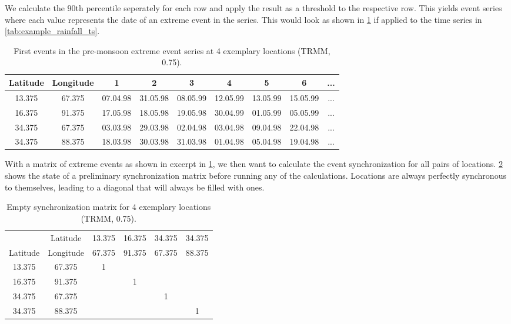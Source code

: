 We calculate the 90th percentile seperately for each row and apply the result as a threshold to the respective row. This yields event series where each value represents the date of an extreme event in the series. This would look as shown in \cref{tab:example_rainfall_events} if applied to the time series in \cref{tab:example_rainfall_ts}.

\begin{table}[h]
  \centering
  \begin{tabular}{ |c|c|ccccccc| }
    \hline
    Latitude & Longitude & 1 & 2 & 3 & 4 & 5 & 6 & ... \\
    \hline
    13.375 & 67.375 & 07.04.98 & 31.05.98 & 08.05.99 & 12.05.99 & 13.05.99 & 15.05.99 & ... \\
    16.375 & 91.375 & 17.05.98 & 18.05.98 & 19.05.98 & 30.04.99 & 01.05.99 & 05.05.99 & ... \\
    34.375 & 67.375 & 03.03.98 & 29.03.98 & 02.04.98 & 03.04.98 & 09.04.98 & 22.04.98 & ... \\
    34.375 & 88.375 & 18.03.98 & 30.03.98 & 31.03.98 & 01.04.98 & 05.04.98 & 19.04.98 & ... \\
    \hline
  \end{tabular}
  \caption{First events in the pre-monsoon extreme event series at 4 exemplary locations (TRMM, 0.75\degree).}
  \label{tab:example_rainfall_events}
\end{table}

With a matrix of extreme events as shown in excerpt in \cref{tab:example_rainfall_events}, we then want to calculate the event synchronization for all pairs of locations. \cref{tab:example_empty_sync} shows the state of a preliminary synchronization matrix before running any of the calculations. Locations are always perfectly synchronous to themselves, leading to a diagonal that will always be filled with ones.

\begin{table}[h]
  \centering
  \begin{tabular}{ |cc|cccc| }
    \hline
     & Latitude & 13.375 & 16.375 & 34.375 & 34.375 \\
    Latitude & Longitude & 67.375 & 91.375 & 67.375 & 88.375 \\
    \hline
    13.375 & 67.375 & 1 &   &   &   \\
    16.375 & 91.375 &   & 1 &   &   \\
    34.375 & 67.375 &   &   & 1 &   \\
    34.375 & 88.375 &   &   &   & 1 \\
    \hline
  \end{tabular}
  \caption{Empty synchronization matrix for 4 exemplary locations (TRMM, 0.75\degree).}
  \label{tab:example_empty_sync}
\end{table}

